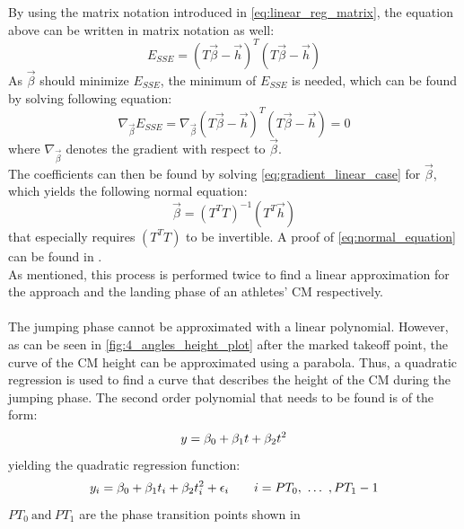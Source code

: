 By using the matrix notation introduced in \autoref{eq:linear_reg_matrix},
the equation above can be written in matrix notation as well:
\begin{equation}\label{eq:sse_matrix}
    E_{SSE} = (T\vec{\beta} - \vec{h})^T(T\vec{\beta} - \vec{h})
\end{equation}
As $\vec{\beta}$ should minimize $E_{SSE}$, the minimum of $E_{SSE}$ is
needed, which can be found by solving following equation:
\begin{equation}\label{eq:gradient_linear_case}
    \nabla_{\vec{\beta}}E_{SSE} = \nabla_{\vec{\beta}}(T\vec{\beta} - \vec{h})^T(T\vec{\beta} - \vec{h}) = 0
\end{equation}
where $\nabla_{\vec{\beta}}$ denotes the gradient with respect to $\vec{\beta}$.\\
The coefficients can then be found by solving
\autoref{eq:gradient_linear_case} for $\vec{\beta}$, which yields the 
following normal equation:
\begin{equation}\label{eq:normal_equation}
    \vec{\beta} = (T^T T)^{-1}(T^T\vec{h})
\end{equation}
that especially requires $(T^{T} T)$ to be invertible.
A proof of \autoref{eq:normal_equation} can be found in
\cite{proof_linear_regression_mat}.\\
As mentioned, this process is performed twice to find a linear approximation
for the approach and the landing phase of an athletes' \ac{CM} respectively.\\\\
The jumping phase cannot be approximated with a linear polynomial.
However, as can be seen in \autoref{fig:4_angles_height_plot} after the marked
takeoff point, the curve of the \ac{CM} height can be approximated using a
parabola.
Thus, a quadratic regression is used to find a curve that describes the height
of the \ac{CM} during the jumping phase.
The second order polynomial that needs to be found is of the form:
\begin{equation}\label{eq:quadratic_function}
    \\y = \beta_0 + \beta_1t + \beta_2t^2
\end{equation}
yielding the quadratic regression function:
\begin{equation}\label{eq:quadratic_reg_function}
    \\y_i = \beta_0 + \beta_1t_i + \beta_2t_i^2 + \epsilon_i
    \quad\quad
    i = PT_0,\ \dots\ ,PT_1 - 1
\end{equation}
$PT_0\ \text{and}\ PT_1$ are the phase transition points shown in
